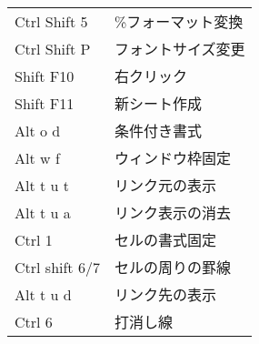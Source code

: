 \documentclass[dvipdfmx]{jsarticle}
\begin{document}
\begin{center}
\begin{tabular}{ll}
Ctrl Shift 5 & \%フォーマット変換\\
Ctrl Shift P & フォントサイズ変更\\
Shift F10 & 右クリック\\
Shift F11 & 新シート作成\\
Alt o d & 条件付き書式\\
Alt w f & ウィンドウ枠固定\\
Alt t u t & リンク元の表示\\
Alt t u a & リンク表示の消去\\
Ctrl 1 & セルの書式固定\\
Ctrl shift 6/7 & セルの周りの罫線\\
Alt t u d & リンク先の表示\\
Ctrl 6 & 打消し線\\ \bottomrule
  \end{tabular}
\end{center}
\end{document}
